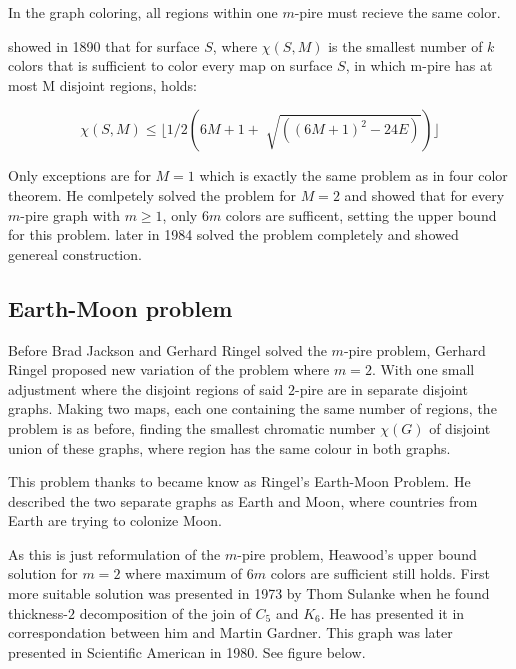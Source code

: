 In the graph coloring, all regions within one $m$-pire must recieve the same color.

\textcite{Heawood1947mapColourProblem} showed in 1890 that for surface $S$, where $\chi(S, M)$ is the smallest number of $k$ colors that is sufficient to color every map on surface $S$, in which m-pire has at most M disjoint regions, holds:

\begin{equation}
\chi(S, M) \leq \lfloor 1/2(6M + 1 + \sqrt[]{((6M + 1)^2 - 24E)}) \rfloor
\end{equation}

Only exceptions are for $M=1$ which is exactly the same problem as in four color theorem. He comlpetely solved the problem for $M=2$ and showed that for every $m$-pire graph with $m \geq 1$, only $6m$ colors are sufficent, setting the upper bound for this problem.
\textcite{jackson1984solution} later in 1984 solved the problem completely and showed genereal construction. 

\subsection{Earth-Moon problem}

Before Brad Jackson and Gerhard Ringel solved the $m$-pire problem, Gerhard Ringel proposed new variation of the problem where $m = 2$. With one small adjustment where the disjoint regions of said $2$-pire are in separate disjoint graphs. Making two maps, each one containing the same number of regions, the problem is as before, finding the smallest chromatic number $\chi(G)$ of disjoint union of these graphs, where region has the same colour in both graphs. 

This problem thanks to \textcite{kainen1974some} became know as Ringel’s Earth-Moon Problem. He described the two separate graphs as Earth and Moon, where countries from Earth are trying to colonize Moon.

As this is just reformulation of the $m$-pire problem, Heawood’s upper bound solution for $m = 2$ where maximum of $6m$ colors are sufficient still holds. First more suitable solution was presented in 1973 by Thom Sulanke when he found thickness-$2$ decomposition of the join of $C_5$ and $K_6$. He has presented it in correspondation between him and Martin Gardner. This graph was later presented in Scientific American in
1980. See figure below.

